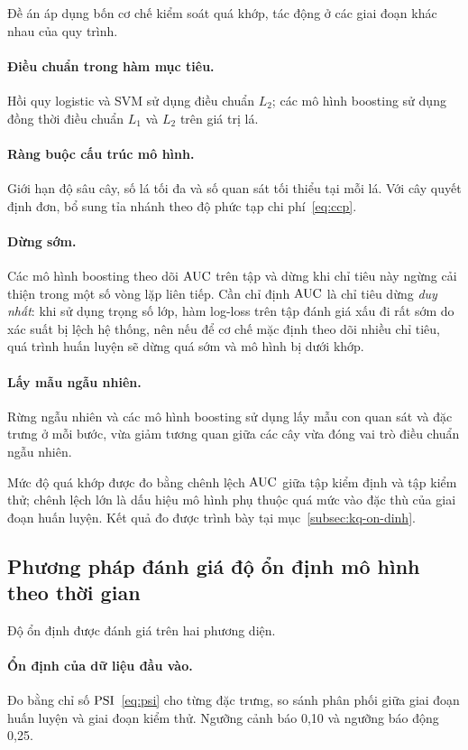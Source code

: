 Đề án áp dụng bốn cơ chế kiểm soát quá khớp, tác động ở các giai đoạn khác nhau
của quy trình.

\paragraph{Điều chuẩn trong hàm mục tiêu.} Hồi quy logistic và SVM sử dụng điều
chuẩn $L_2$; các mô hình boosting sử dụng đồng thời điều chuẩn $L_1$ và $L_2$
trên giá trị lá.

\paragraph{Ràng buộc cấu trúc mô hình.} Giới hạn độ sâu cây, số lá tối đa và số
quan sát tối thiểu tại mỗi lá. Với cây quyết định đơn, bổ sung tỉa nhánh theo độ
phức tạp chi phí~\eqref{eq:ccp}.

\paragraph{Dừng sớm.} Các mô hình boosting theo dõi $\mathrm{AUC}$ trên tập
 và dừng khi chỉ tiêu này ngừng cải thiện trong một số vòng lặp
liên tiếp. Cần chỉ định $\mathrm{AUC}$ là chỉ tiêu dừng \textit{duy nhất}: khi sử dụng
trọng số lớp, hàm log-loss trên tập đánh giá xấu đi rất sớm do xác suất bị lệch
hệ thống, nên nếu để cơ chế mặc định theo dõi nhiều chỉ tiêu, quá trình huấn
luyện sẽ dừng quá sớm và mô hình bị dưới khớp.

\paragraph{Lấy mẫu ngẫu nhiên.} Rừng ngẫu nhiên và các mô hình boosting sử dụng
lấy mẫu con quan sát và đặc trưng ở mỗi bước, vừa giảm tương quan giữa các cây
vừa đóng vai trò điều chuẩn ngẫu nhiên.

Mức độ quá khớp được đo bằng chênh lệch $\mathrm{AUC}$ giữa tập kiểm định và tập kiểm
thử; chênh lệch lớn là dấu hiệu mô hình phụ thuộc quá mức vào đặc thù của giai
đoạn huấn luyện. Kết quả đo được trình bày tại mục~\ref{subsec:kq-on-dinh}.

\subsection{Phương pháp đánh giá độ ổn định mô hình theo thời gian}
\label{subsec:do-on-dinh}

Độ ổn định được đánh giá trên hai phương diện.

\paragraph{Ổn định của dữ liệu đầu vào.} Đo bằng chỉ số $\mathrm{PSI}$~\eqref{eq:psi} cho
từng đặc trưng, so sánh phân phối giữa giai đoạn huấn luyện và giai đoạn kiểm
thử. Ngưỡng cảnh báo 0,10 và ngưỡng báo động 0,25.

